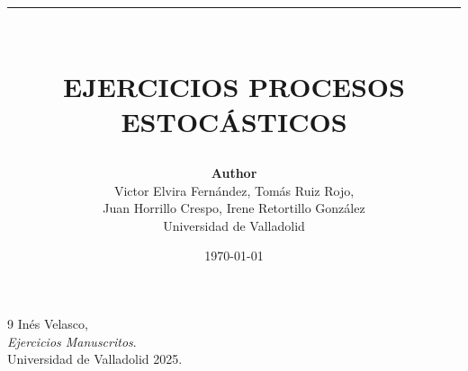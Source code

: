 \documentclass{article}
\newcommand{\HRule}[1]{\rule{\linewidth}{#1}}
\begin{document}

\title{ \normalsize \textsc{}
\\ [2.0cm]
\HRule{1.5pt} \\
\LARGE \textbf{\uppercase{Ejercicios Procesos Estocásticos}
}
}
\author{\textbf{Author} \\
    Victor Elvira Fernández, Tomás Ruiz Rojo,\\ Juan Horrillo Crespo, Irene Retortillo González \\
    Universidad de Valladolid \\
    \date{\today}}

\maketitle
\newpage



\tableofcontents
\newpage



% 

% 
% 

\newpage


\begin{thebibliography}{9}
    Inés Velasco, \\ \textit{Ejercicios Manuscritos}. \\ Universidad de Valladolid 2025.
\end{thebibliography}

\end{document}
